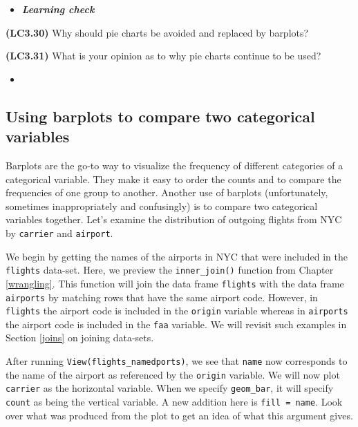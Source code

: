 \documentclass[12pt,]{krantz}
\makeatletter
\newenvironment{Shaded}{\begin{snugshade}}{\end{snugshade}}
\newcommand{\KeywordTok}[1]{\textcolor[rgb]{0.27,0.27,0.27}{\textbf{#1}}}
\newcommand{\DataTypeTok}[1]{\textcolor[rgb]{0.27,0.27,0.27}{#1}}
\newcommand{\StringTok}[1]{\textcolor[rgb]{0.5,0.5,0.5}{#1}}
\newcommand{\OperatorTok}[1]{\textcolor[rgb]{0.43,0.43,0.43}{\textbf{#1}}}
\newcommand{\NormalTok}[1]{#1}
\newenvironment{kframe}{%
\medskip{}
\setlength{\fboxsep}{.8em}
 \def\at@end@of@kframe{}%
 \ifinner\ifhmode%
  \def\at@end@of@kframe{\end{minipage}}%
  \begin{minipage}{\columnwidth}%
 \fi\fi%
 \def\FrameCommand##1{\hskip\@totalleftmargin \hskip-\fboxsep
 \colorbox{shadecolor}{##1}\hskip-\fboxsep
     \hskip-\linewidth \hskip-\@totalleftmargin \hskip\columnwidth}%
 \MakeFramed {\advance\hsize-\width
   \@totalleftmargin\z@ \linewidth\hsize
   \@setminipage}}%
 {\par\unskip\endMakeFramed%
 \at@end@of@kframe}
\renewenvironment{Shaded}{\begin{kframe}}{\end{kframe}}
\newenvironment{rmdblock}[1]
  {\begin{shaded*}
  \begin{itemize}
  \renewcommand{\labelitemi}{
    \raisebox{-.7\height}[0pt][0pt]{
    }
  }
  \item
  }
  {
  \end{itemize}
  \end{shaded*}
  }
\newenvironment{learncheck}
  {\begin{rmdblock}{warning}}
  {\end{rmdblock}}
\theoremstyle{definition}
\theoremstyle{definition}
\theoremstyle{definition}
\theoremstyle{remark}
\makeatother
\begin{document}
\begin{learncheck}
\textbf{\emph{Learning check}}
\end{learncheck}

\textbf{(LC3.30)} Why should pie charts be avoided and replaced by
barplots?

\textbf{(LC3.31)} What is your opinion as to why pie charts continue to
be used?

\begin{learncheck}

\end{learncheck}

\subsection{Using barplots to compare two categorical
variables}\label{using-barplots-to-compare-two-categorical-variables}

Barplots are the go-to way to visualize the frequency of different
categories of a categorical variable. They make it easy to order the
counts and to compare the frequencies of one group to another. Another
use of barplots (unfortunately, sometimes inappropriately and
confusingly) is to compare two categorical variables together. Let's
examine the distribution of outgoing flights from NYC by
\texttt{carrier} and \texttt{airport}.

We begin by getting the names of the airports in NYC that were included
in the \texttt{flights} data-set. Here, we preview the
\texttt{inner\_join()} function from Chapter \ref{wrangling}. This
function will join the data frame \texttt{flights} with the data frame
\texttt{airports} by matching rows that have the same airport code.
However, in \texttt{flights} the airport code is included in the
\texttt{origin} variable whereas in \texttt{airports} the airport code
is included in the \texttt{faa} variable. We will revisit such examples
in Section \ref{joins} on joining data-sets.

\begin{Shaded}
\end{Shaded}

After running \texttt{View(flights\_namedports)}, we see that
\texttt{name} now corresponds to the name of the airport as referenced
by the \texttt{origin} variable. We will now plot \texttt{carrier} as
the horizontal variable. When we specify \texttt{geom\_bar}, it will
specify \texttt{count} as being the vertical variable. A new addition
here is \texttt{fill\ =\ name}. Look over what was produced from the
plot to get an idea of what this argument gives.
\end{document}
